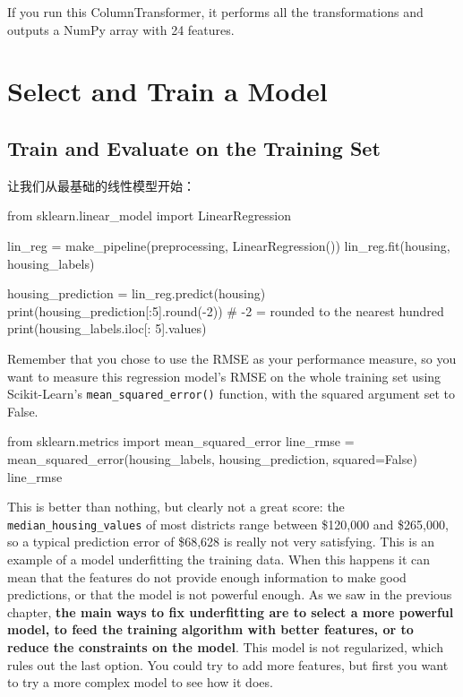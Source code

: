 If you run this ColumnTransformer, it performs all the transformations and outputs a
NumPy array with 24 features.
\section{Select and Train a Model}

\subsection{Train and Evaluate on the Training Set}
让我们从最基础的线性模型开始：

\begin{pyc}
from sklearn.linear_model import LinearRegression

lin_reg = make_pipeline(preprocessing, LinearRegression())
lin_reg.fit(housing, housing_labels)
\end{pyc}

\begin{pyc}
housing_prediction = lin_reg.predict(housing)
print(housing_prediction[:5].round(-2))
# -2 = rounded to the nearest hundred
print(housing_labels.iloc[: 5].values)
\end{pyc}

Remember that you chose to use the RMSE as your performance
measure, so you want to measure this regression model's RMSE on the whole training
set using Scikit-Learn's \verb|mean_squared_error()| function, with the squared argument
set to False.

\begin{pyc}
from sklearn.metrics import mean_squared_error
line_rmse = mean_squared_error(housing_labels, 
                               housing_prediction,
                               squared=False)
line_rmse
\end{pyc}

This is better than nothing, but clearly not a great score: the \verb|median_housing_values|
of most districts range between \$120,000 and \$265,000, so a typical prediction error
of \$68,628 is really not very satisfying. This is an example of a model underfitting the
training data. When this happens it can mean that the features do not provide enough
information to make good predictions, or that the model is not powerful enough.
As we saw in the previous chapter, \textbf{the main ways to fix underfitting are to select a
more powerful model, to feed the training algorithm with better features, or to reduce
the constraints on the model}. This model is not regularized, which rules out the last
option. You could try to add more features, but first you want to try a more complex
model to see how it does.

